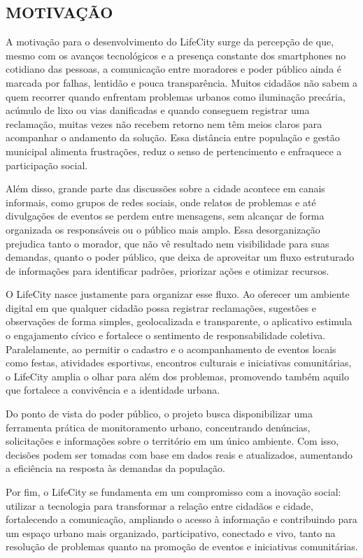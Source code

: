 \subsection{MOTIVAÇÃO}

A motivação para o desenvolvimento do LifeCity surge da percepção de que, mesmo
com os avanços tecnológicos e a presença constante dos smartphones no cotidiano
das pessoas, a comunicação entre moradores e poder público ainda é marcada por
falhas, lentidão e pouca transparência. Muitos cidadãos não sabem a quem recorrer
quando enfrentam problemas urbanos como iluminação precária, acúmulo de lixo ou
vias danificadas e quando conseguem registrar uma reclamação, muitas vezes não
recebem retorno nem têm meios claros para acompanhar o andamento da solução.
Essa distância entre população e gestão municipal alimenta frustrações, reduz o
senso de pertencimento e enfraquece a participação social.

Além disso, grande parte das discussões sobre a cidade acontece em canais
informais, como grupos de redes sociais, onde relatos de problemas e até
divulgações de eventos se perdem entre mensagens, sem alcançar de forma
organizada os responsáveis ou o público mais amplo. Essa desorganização prejudica
tanto o morador, que não vê resultado nem visibilidade para suas demandas, quanto
o poder público, que deixa de aproveitar um fluxo estruturado de informações para
identificar padrões, priorizar ações e otimizar recursos.

O LifeCity nasce justamente para organizar esse fluxo. Ao oferecer um ambiente
digital em que qualquer cidadão possa registrar reclamações, sugestões e
observações de forma simples, geolocalizada e transparente, o aplicativo estimula o
engajamento cívico e fortalece o sentimento de responsabilidade coletiva.
Paralelamente, ao permitir o cadastro e o acompanhamento de eventos locais como
festas, atividades esportivas, encontros culturais e iniciativas comunitárias, o
LifeCity amplia o olhar para além dos problemas, promovendo também aquilo que
fortalece a convivência e a identidade urbana.

Do ponto de vista do poder público, o projeto busca disponibilizar uma ferramenta
prática de monitoramento urbano, concentrando denúncias, solicitações e
informações sobre o território em um único ambiente. Com isso, decisões podem
ser tomadas com base em dados reais e atualizados, aumentando a eficiência na
resposta às demandas da população.

Por fim, o LifeCity se fundamenta em um compromisso com a inovação social:
utilizar a tecnologia para transformar a relação entre cidadãos e cidade, fortalecendo
a comunicação, ampliando o acesso à informação e contribuindo para um espaço
urbano mais organizado, participativo, conectado e vivo, tanto na resolução de
problemas quanto na promoção de eventos e iniciativas comunitárias.

